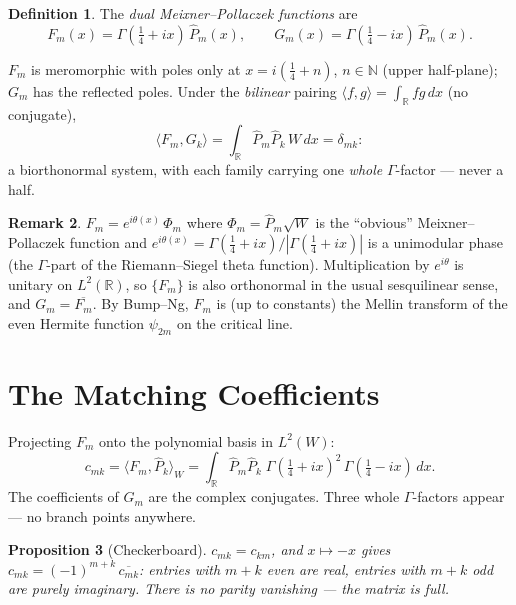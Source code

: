 \documentclass[11pt,a4paper]{article}
\theoremstyle{definition}
\newtheorem{definition}{Definition}[section]
\newtheorem{remark}[definition]{Remark}
\theoremstyle{plain}
\newtheorem{proposition}[definition]{Proposition}
\newcommand{\R}{\mathbb{R}}
\begin{document}
\begin{definition}
The \emph{dual Meixner--Pollaczek functions} are
\[
  F_m(x) = \Gamma(\tfrac14 + ix)\, \widehat{P}_m(x),
  \qquad
  G_m(x) = \Gamma(\tfrac14 - ix)\, \widehat{P}_m(x).
\]
\end{definition}

$F_m$ is meromorphic with poles only at $x = i(\tfrac14 + n)$,
$n \in \mathbb{N}$ (upper half-plane); $G_m$ has the reflected poles.
Under the \emph{bilinear} pairing $\langle f, g\rangle = \int_\R fg\,dx$
(no conjugate),
\[
  \langle F_m, G_k \rangle
  = \int_\R \widehat{P}_m \widehat{P}_k\, W\, dx = \delta_{mk}:
\]
a biorthonormal system, with each family carrying one \emph{whole}
$\Gamma$-factor --- never a half.

\begin{remark}
$F_m = e^{i\theta(x)}\, \Phi_m$ where
$\Phi_m = \widehat{P}_m\sqrt{W}$ is the ``obvious''
Meixner--Pollaczek function and
$e^{i\theta(x)} = \Gamma(\tfrac14+ix)/|\Gamma(\tfrac14+ix)|$ is a
unimodular phase (the $\Gamma$-part of the Riemann--Siegel theta
function). Multiplication by $e^{i\theta}$ is unitary on $L^2(\R)$, so
$\{F_m\}$ is also orthonormal in the usual sesquilinear sense, and
$G_m = \overline{F_m}$. By Bump--Ng, $F_m$ is (up to constants) the
Mellin transform of the even Hermite function $\psi_{2m}$ on the
critical line.
\end{remark}

\section{The Matching Coefficients}

Projecting $F_m$ onto the polynomial basis in $L^2(W)$:
\begin{equation}\label{eq:cmk}
  c_{mk} = \langle F_m, \widehat{P}_k \rangle_W
  = \int_\R \widehat{P}_m \widehat{P}_k\;
    \Gamma(\tfrac14+ix)^2\, \Gamma(\tfrac14-ix)\, dx.
\end{equation}
The coefficients of $G_m$ are the complex conjugates. Three whole
$\Gamma$-factors appear --- no branch points anywhere.

\begin{proposition}[Checkerboard]
$c_{mk} = c_{km}$, and $x \mapsto -x$ gives
$c_{mk} = (-1)^{m+k}\, \overline{c_{mk}}$: entries with $m+k$ even are
real, entries with $m+k$ odd are purely imaginary. There is no parity
vanishing --- the matrix is full.
\end{proposition}
\end{document}
